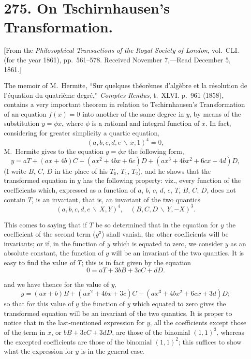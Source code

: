 \documentclass[11pt,a4paper]{article}
\theoremstyle{definition}
\begin{document}
\section*{275. On Tschirnhausen's Transformation.}

[From the \textit{Philosophical Transactions of the Royal Society of London},
vol.~CLI. (for the year 1861), pp.~561--578.
Received November 7,---Read December 5, 1861.]
\vspace{0.5em}

The memoir of M.~Hermite, ``Sur quelques th\'{e}or\`{e}mes d'alg\`{e}bre et la r\'{e}solution
de l'\'{e}quation du quatri\`{e}me degr\'{e},'' \textit{Comptes Rendus}, t.~XLVI. p.~961 (1858),
contains a very important theorem in relation to Tschirnhausen's Transformation of an
equation $f(x)=0$ into another of the same degree in $y$, by means of the substitution
$y = \phi x$, where $\phi$ is a rational and integral function of $x$. In fact, considering
for greater simplicity a quartic equation,
\[(a,b,c,d,e\,\backslash\!\!\,x,1)^{4} = 0,\]
M.~Hermite gives to the equation $y = \phi x$ the following form,
\[y = aT + (ax+4b)C + (ax^{2}+4bx+6c)D + (ax^{3}+4bx^{2}+6cx+4d)D,\]
(I write $B$, $C$, $D$ in the place of his $T_{0}$, $T_{1}$, $T_{2}$), and he shows that the
transformed equation in $y$ has the following property: viz., every function of the
coefficients which, expressed as a function of $a$, $b$, $c$, $d$, $e$, $T$, $B$, $C$, $D$,
does not contain $T$, is an invariant, that is, an invariant of the two quantics
\[(a,b,c,d,e\,\backslash\!\!\,X,Y)^{4}, \quad (B,C,D\,\backslash\!\!\,Y,-X)^{3}.\]

This comes to saying that if $T$ be so determined that in the equation for $y$ the
coefficient of the second term ($y^{3}$) shall vanish, the other coefficients will be
invariants; or if, in the function of $y$ which is equated to zero, we consider $y$ as an
absolute constant, the function of $y$ will be an invariant of the two quantics. It is
easy to find the value of $T$; this is in fact given by the equation
\[0 = aT + 3bB + 3cC + dD.\]

\newpage

and we have thence for the value of $y$,
\[y = (ax+b)B + (ax^{2}+4bx+3c)C + (ax^{3}+4bx^{2}+6cx+3d)D;\]
so that for this value of $y$ the function of $y$ which equated to zero gives the
transformed equation will be an invariant of the two quantics. It is proper to notice
that in the last-mentioned expression for $y$, all the coefficients except those of the
term in $x$, or $bB+3cC+3dD$, are those of the binomial $(1,1)^{3}$, whereas the excepted
coefficients are those of the binomial $(1,1)^{2}$; this suffices to show what the
expression for $y$ is in the general case.
\end{document}
